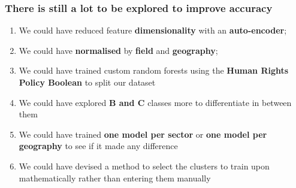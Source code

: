 \documentclass[12pt]{report}
\begin{document}
\subsubsection{There is still a lot to be explored to improve accuracy}
\begin{enumerate}
    \item We could have reduced feature \textbf{dimensionality} with an \textbf{auto-encoder};
    \item We could have \textbf{normalised} by \textbf{field} and \textbf{geography};
    \item We could have trained custom random forests using the \textbf{Human Rights Policy Boolean} to split our dataset
    \item We could have explored \textbf{B and C} classes more to differentiate in between them
    \item We could have trained \textbf{one model per sector} or \textbf{one model per geography} to see if it made any difference
    \item We could have devised a method to select the clusters to train upon mathematically rather than entering them manually
\end{enumerate}
\end{document}
